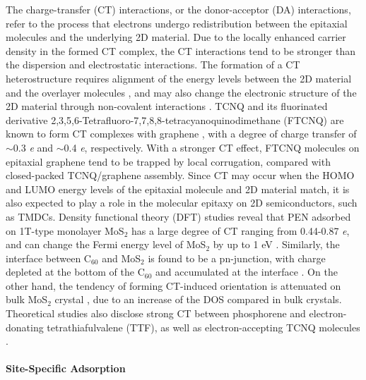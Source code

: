 The charge-transfer (CT) interactions, or the donor-acceptor (DA)
interactions, refer to the process that electrons undergo
redistribution between the epitaxial molecules and the underlying 2D
material. Due to the locally enhanced carrier density in the formed CT
complex, the CT interactions tend to be stronger than the dispersion
and electrostatic interactions. The formation of a CT heterostructure
requires alignment of the energy levels between the 2D material and
the overlayer molecules \cite{Akiyoshi_2015_DA}, and may also change
the electronic structure of the 2D material through non-covalent
interactions
\cite{Cai_2015_doping_2D_rev,Wehling_2008_doping,Zhang_2011_rev_pipi_gr}.
TCNQ and its fluorinated derivative
2,3,5,6-Tetra\-fluoro-7,7,8,8-tetra\-cyanoquino\-dimethane (FTCNQ) are
known to form CT complexes with graphene
\cite{Chen_2007_TCNQ_gr,Voggu_2008_TCNQ,Barja_2010_TCNQ_gr}, with a
degree of charge transfer of $\sim{}$0.3 \textit{e} and $\sim{}$0.4
\textit{e}, respectively. With a stronger CT effect, FTCNQ molecules
on epitaxial graphene tend to be trapped by local
corrugation\cite{Barja_2010_TCNQ_gr}, compared with closed-packed
TCNQ/graphene assembly.  Since CT may occur when the HOMO and LUMO
energy levels of the epitaxial molecule and 2D material match, it is
also expected to play a role in the molecular epitaxy on 2D
semiconductors, such as TMDCs. Density functional theory (DFT) studies
reveal that PEN adsorbed on 1T-type monolayer MoS\(_{\text{2}}\) has a
large degree of CT ranging from 0.44-0.87 \emph{e}, and can change the
Fermi energy level of MoS\(_{\text{2}}\) by up to 1 eV
\cite{Shen_2017_DFT_mos2_pent}. Similarly, the interface between
C\(_{\text{60}}\) and MoS\(_{\text{2}}\) is found to be a pn-junction,
with charge depleted at the bottom of the C\(_{\text{60}}\) and
accumulated at the interface \cite{Chen_2016_c60_mos2}. On the other
hand, the tendency of forming CT-induced orientation is attenuated on
bulk MoS\(_{\text{2}}\) crystal \cite{Sakurai_1991_c60_mos2}, due to
an increase of the DOS compared in bulk crystals. Theoretical studies
also disclose strong CT between phosphorene and electron-donating
tetrathiafulvalene (TTF), as well as electron-accepting TCNQ molecules
\cite{Zhang_2015_DA_phosphorene}.


\paragraph{Site-Specific Adsorption}
\label{sec:org87b0c12}

